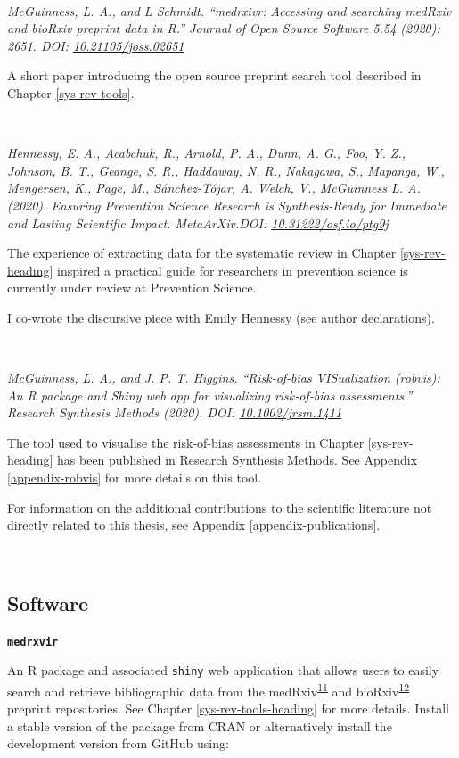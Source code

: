 \documentclass[a4paper, twoside]{templates/ociamthesis}
\begin{document}
~

\emph{McGuinness, L. A., and L Schmidt. ``medrxivr: Accessing and searching medRxiv and bioRxiv preprint data in R.'' Journal of Open Source Software 5.54 (2020): 2651. DOI: \href{https://doi.org/10.21105/joss.02651}{10.21105/joss.02651}}

A short paper introducing the open source preprint search tool described in Chapter \ref{sys-rev-tools}.

~

\emph{Hennessy, E. A., Acabchuk, R., Arnold, P. A., Dunn, A. G., Foo, Y. Z., Johnson, B. T., Geange, S. R., Haddaway, N. R., Nakagawa, S., Mapanga, W., Mengersen, K., Page, M., Sánchez-Tójar, A. Welch, V., McGuinness L. A. (2020). Ensuring Prevention Science Research is Synthesis-Ready for Immediate and Lasting Scientific Impact. MetaArXiv.DOI: \href{https://doi.org/10.31222/osf.io/ptg9j}{10.31222/osf.io/ptg9j}}

The experience of extracting data for the systematic review in Chapter \ref{sys-rev-heading} inspired a practical guide for researchers in prevention science is currently under review at Prevention Science.

I co-wrote the discursive piece with Emily Hennessy (see author declarations).

~

\emph{McGuinness, L. A., and J. P. T. Higgins. ``Risk‐of‐bias VISualization (robvis): An R package and Shiny web app for visualizing risk‐of‐bias assessments.'' Research Synthesis Methods (2020). DOI: \href{https://doi.org/10.1002/jrsm.1411}{10.1002/jrsm.1411}}

The tool used to visualise the risk-of-bias assessments in Chapter \ref{sys-rev-heading} has been published in Research Synthesis Methods. See Appendix \ref{appendix-robvis} for more details on this tool.

For information on the additional contributions to the scientific literature not directly related to this thesis, see Appendix \ref{appendix-publications}.

~

\hypertarget{software}{%
\subsection{Software}\label{software}}

\textbf{\texttt{medrxvir}}

An R package and associated \texttt{shiny} web application that allows users to easily search and retrieve bibliographic data from the medRxiv\textsuperscript{\protect\hyperlink{ref-rawlinson2019}{11}} and bioRxiv\textsuperscript{\protect\hyperlink{ref-sever2019}{12}} preprint repositories. See Chapter \ref{sys-rev-tools-heading} for more details. Install a stable version of the package from CRAN or alternatively install the development version from GitHub using:
\end{document}
